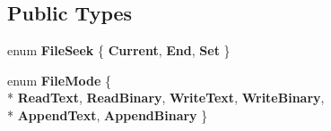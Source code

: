 \subsection*{Public Types}
\begin{DoxyCompactItemize}
\item 
enum {\bfseries File\+Seek} \{ {\bfseries Current}, 
{\bfseries End}, 
{\bfseries Set}
 \}\hypertarget{classHatchit_1_1Core_1_1IFile_a4fa08027e9a6d42857a363ae63d4aeb6}{}\label{classHatchit_1_1Core_1_1IFile_a4fa08027e9a6d42857a363ae63d4aeb6}

\item 
enum {\bfseries File\+Mode} \{ \\*
{\bfseries Read\+Text}, 
{\bfseries Read\+Binary}, 
{\bfseries Write\+Text}, 
{\bfseries Write\+Binary}, 
\\*
{\bfseries Append\+Text}, 
{\bfseries Append\+Binary}
 \}\hypertarget{classHatchit_1_1Core_1_1IFile_aecd13e31816da4215e320df27f5b4daf}{}\label{classHatchit_1_1Core_1_1IFile_aecd13e31816da4215e320df27f5b4daf}

\end{DoxyCompactItemize}
